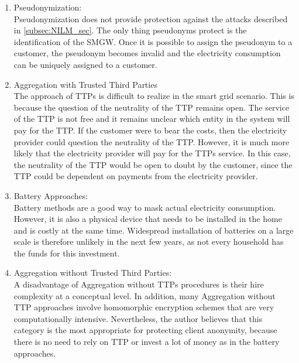 \begin{enumerate}
\item Pseudonymization:\\
Pseudonymization does not provide protection against the attacks described in \ref{subsec:NILM_sec}. The only thing pseudonyms protect is the identification of the \gls{SMGW}. Once it is possible to assign the pseudonym to a customer, the pseudonym becomes invalid and the electricity consumption can be uniquely assigned to a customer. 

\item Aggregation with Trusted Third Parties\\
The approach of \gls{TTP}s is difficult to realize in the smart grid scenario. This is because the question of the neutrality of the \gls{TTP} remains open. The service of the \gls{TTP} is not free and it remains unclear which entity in the system will pay for the \gls{TTP}. If the customer were to bear the costs, then the electricity provider could question the neutrality of the \gls{TTP}. However, it is much more likely that the electricity provider will pay for the \gls{TTP}s service. In this case, the neutrality of the \gls{TTP} would be open to doubt by the customer, since the \gls{TTP} could be dependent on payments from the electricity provider.

\item Battery Approaches:\\
Battery methods are a good way to mask actual electricity consumption. However, it is also a physical device that needs to be installed in the home and is costly at the same time. Widespread installation of batteries on a large scale is therefore unlikely in the next few years, as not every household has the funds for this investment.

\item Aggregation without Trusted Third Parties:\\
\label{subsec:aggegration_without_ttp}
A disadvantage of Aggregation without \gls{TTP}s procedures is their hire complexity at a conceptual level. In addition, many Aggregation without \gls{TTP} approaches involve homomorphic encryption schemes that are very computationally intensive. Nevertheless, the author believes that this category is the most appropriate for protecting client anonymity, because there is no need to rely on \gls{TTP} or invest a lot of money as in the battery approaches.
\end{enumerate}
